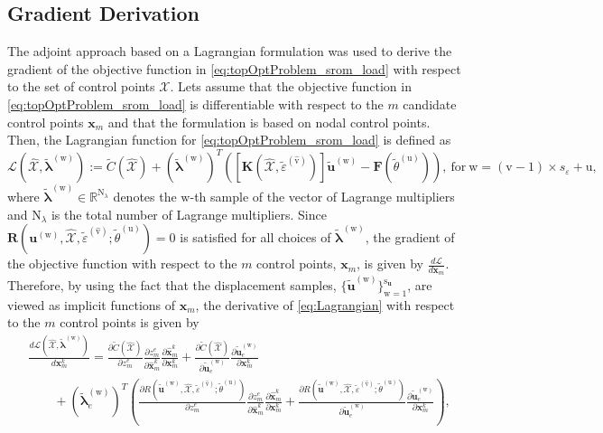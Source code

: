 \subsection{Gradient Derivation}

The adjoint approach based on a Lagrangian formulation was used to derive the gradient of the objective function in \eqref{eq:topOptProblem_srom_load} with respect to the set of control points $\mathcal{X}$. Lets assume that the objective function in \eqref{eq:topOptProblem_srom_load} is differentiable with respect to the $m$ candidate control points $\bm x_m$ and that the formulation is based on nodal control points. Then, the Lagrangian function for \eqref{eq:topOptProblem_srom_load} is defined as
\begin{equation}
\label{eq:Lagrangian}
\mathcal{L}(\widehat{\mathcal{X}},\tilde{\bm \lambda}^{(\mathrm{w})}):=\tilde{C}(\widehat{\mathcal{X}}) +(\tilde{\bm \lambda}^{(\mathrm{w})})^{T}([\bm K(\widehat{\mathcal{X}}, \tilde\varepsilon^{(\hat{\mathrm{v}})})]\tilde{\bm u}^{(\mathrm{w})} - \bm F(\tilde\theta^{(\mathrm{u})})),\ \mbox{for}\ \mathrm{w} = (\mathrm{v}-1)\times{s}_{\varepsilon}+\mathrm{u} ,
\end{equation}
where $\tilde{\bm \lambda}^{(\mathrm{w})}\in\mathbb{R}^{\mathrm{N}_{\lambda}}$ denotes the $\mathrm{w}$-th sample of the vector of Lagrange multipliers and $\mathrm{N}_{\lambda}$ is the total number of Lagrange multipliers. Since $\bm{R}(\bm u^{(\mathrm{w})}, \widehat{\mathcal{X}}, \tilde\varepsilon^{(\hat{\mathrm{v}})}; \tilde{\theta}^{(\mathrm{u})}) = 0$ is satisfied for all choices of $\tilde{\bm \lambda}^{(\mathrm{w})}$, the gradient of the objective function with respect to the $m$ control points, $\bm x_m$, is given by $\frac{d\mathcal{L}}{d\bm{x}_m}$. Therefore, by using the fact that the displacement samples, $\{\tilde{\bm u}^{(\mathrm{w})}\}_{\mathrm{w}=1}^{\mathrm{s}_{\bm u}}$, are viewed as implicit functions of $\bm x_m$, the derivative of \eqref{eq:Lagrangian} with respect to the $m$ control points is given by
\begin{equation}
\label{eq:PartialLagrangian}
\begin{aligned}
&\frac{d\mathcal{L}(\widehat{\mathcal{X}}, \tilde{\bm \lambda}^{(\mathrm{w})})}{d\bm x_m^k} = \frac{\partial\tilde{C}(\widehat{\mathcal{X}})}{\partial z_m^e}\frac{\partial z_m^e}{\partial\hat{\bm x}_m^k}\frac{\partial\hat{\bm x}_m^k}{\partial\bm{x}^k_m} + \frac{\partial\tilde{C}(\widehat{\mathcal{X}})}{\partial\tilde{\bm u}_e^{(\mathrm{w})}}\frac{\partial\tilde{\bm u}_e^{(\mathrm{w})}}{\partial\bm x_m^k}
\\
&\qquad+(\tilde{\bm\lambda}_e^{(\mathrm{w})})^{T}\left(\frac{\partial{R}(\tilde{\bm u}^{(\mathrm{w})}, \widehat{\mathcal{X}}, \tilde\varepsilon^{(\hat{\mathrm{v}})}; \tilde{\theta}^{(\mathrm{u})})}{\partial z_m^e}\frac{\partial z_m^e}{\partial\hat{\bm x}_m^k}\frac{\partial\hat{\bm x}_m^k}{\partial\bm x_m^k}  + \frac{\partial{R}(\tilde{\bm u}^{(\mathrm{w})},\widehat{\mathcal{X}}, \tilde\varepsilon^{(\hat{\mathrm{v}})}; \tilde{\theta}^{(\mathrm{u})})}{\partial\tilde{\bm u}_e^{(\mathrm{w})}}\frac{\partial\tilde{\bm u}^{(\mathrm{w})}_e}{\partial\bm x_m^k} \right),
\end{aligned}
\end{equation}
